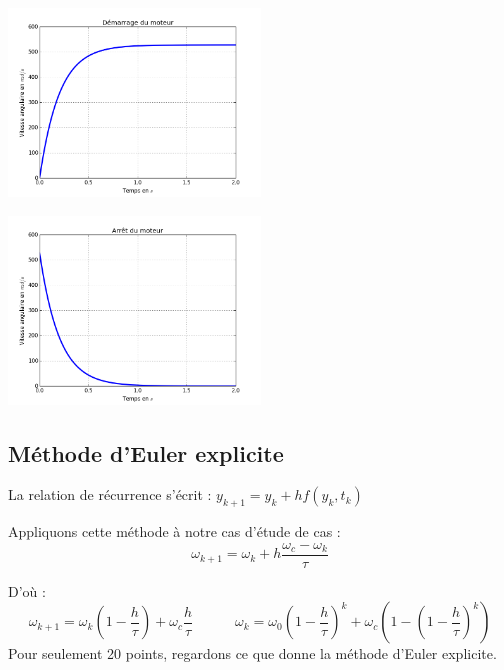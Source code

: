 \documentclass[10pt,fleqn]{article} %
\begin{document}
\begin{minipage}[c]{.47\linewidth}
\begin{center}
\includegraphics[height=5cm]{images/fig_02_bis}
\end{center}
\end{minipage}
\hfill
\begin{minipage}[c]{.47\linewidth}
\begin{center}
\includegraphics[height=5cm]{images/fig_03_bis}
\end{center}
\end{minipage}

\subsection{Méthode d'Euler explicite}
\begin{resultat}
La relation de récurrence s’écrit : $y_{k+1}=y_k+hf(y_k,t_k)$
\end{resultat}

Appliquons cette méthode à notre cas d'étude de cas :
$$\omega_{k+1}=\omega_k+h \dfrac{\omega_c-\omega_k}{\tau}$$

D’où :
$$
\omega_{k+1}=\omega_k \left(1-\dfrac{h}{\tau}\right)+\omega_c \dfrac{h}{\tau}
\quad \quad \quad 
\omega_k=\omega_0 \left(1-\dfrac{h}{\tau}\right)^k+\omega_c\left(1-\left(1-\dfrac{h}{\tau}\right)^k \right)
$$
Pour seulement 20 points, regardons ce que donne la méthode d’Euler explicite.
\end{document}
